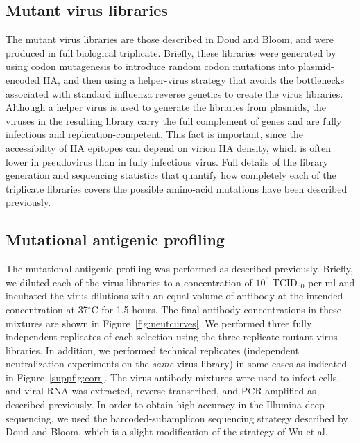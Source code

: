 \documentclass[11pt]{article}
\begin{document}
\subsection*{Mutant virus libraries}
The mutant virus libraries are those described in Doud and Bloom\cite{doud2016accurate}, and were produced in full biological triplicate.
Briefly, these libraries were generated by using codon mutagenesis\cite{bloom2014experimentally} to introduce random codon mutations into plasmid-encoded HA, and then using a helper-virus strategy that avoids the bottlenecks associated with standard influenza reverse genetics to create the virus libraries.
Although a helper virus is used to generate the libraries from plasmids, the viruses in the resulting library carry the full complement of genes and are fully infectious and replication-competent\cite{doud2016accurate}.
This fact is important, since the accessibility of HA epitopes can depend on virion HA density, which is often lower in pseudovirus than in fully infectious virus\cite{corti2011neutralizing,joyce2016vaccine}.
Full details of the library generation and sequencing statistics that quantify how completely each of the triplicate libraries covers the possible amino-acid mutations have been described previously\cite{doud2016accurate}.

\subsection*{Mutational antigenic profiling}
The mutational antigenic profiling was performed as described previously\cite{doud2017complete}. 
Briefly, we diluted each of the virus libraries to a concentration of $10^{6}$ TCID$_{50}$ per ml and incubated the virus dilutions with an equal volume of antibody at the intended concentration at 37$^\circ$C for 1.5 hours.
The final antibody concentrations in these mixtures are shown in Figure~\ref{fig:neutcurves}.
We performed three fully independent replicates of each selection using the three replicate mutant virus libraries.
In addition, we performed technical replicates (independent neutralization experiments on the \emph{same} virus library) in some cases as indicated in Figure~\ref{suppfig:corr}.
The virus-antibody mixtures were used to infect cells, and viral RNA was extracted, reverse-transcribed, and PCR amplified as described previously\cite{doud2017complete}.
In order to obtain high accuracy in the Illumina deep sequencing, we used the barcoded-subamplicon sequencing strategy described by Doud and Bloom\cite{doud2016accurate}, which is a slight modification of the strategy of Wu et al\cite{wu2014high}.
\end{document}
